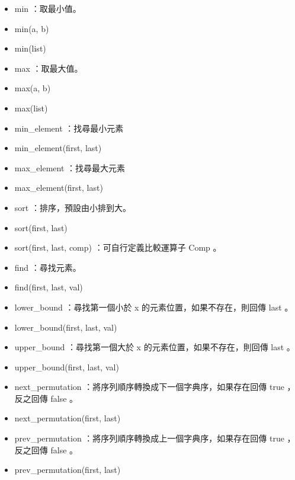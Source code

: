 \begin{itemize}
\item min ：取最小值。
\item min(a, b)
\item min(list)
\item max ：取最大值。
\item max(a, b)
\item max(list)
\item min_element ：找尋最小元素
\item min_element(first, last)
\item max_element ：找尋最大元素
\item max_element(first, last)
\item sort ：排序，預設由小排到大。
\item sort(first, last)
\item sort(first, last, comp) ：可自行定義比較運算子 Comp 。
\item find ：尋找元素。
\item find(first, last, val)
\item lower_bound ：尋找第一個小於 x 的元素位置，如果不存在，則回傳 last 。
\item lower_bound(first, last, val)
\item upper_bound ：尋找第一個大於 x 的元素位置，如果不存在，則回傳 last 。
\item upper_bound(first, last, val)
\item next_permutation ：將序列順序轉換成下一個字典序，如果存在回傳 true ，反之回傳 false 。
\item next_permutation(first, last)
\item prev_permutation ：將序列順序轉換成上一個字典序，如果存在回傳 true ，反之回傳 false 。
\item prev_permutation(first, last)
\end{itemize}